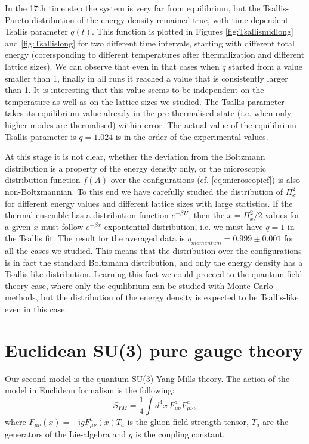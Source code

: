 \documentclass[aps,prd,twocolumn,showpacs,superscriptaddress,groupedaddress]{revtex4}  %
\begin{document}
In the 17th time step the system is very far from equilibrium, but the
Tsallis-Pareto distribution of the energy density remained true, with
time dependent Tsallis parameter $q(t)$. This function is plotted in
Figures \ref{fig:Tsallismidlong} and \ref{fig:Tsallislong} for two
different time intervals, starting with different total energy
(corersponding to different temperatures after thermalization and
different lattice sizes). We can observe that even in that cases when
$q$ started from a value smaller than 1, finally in all runs it
reached a value that is consistently larger than 1. It is interesting
that this value seems to be independent on the temperature as well as
on the lattice sizes we studied. The Tsallis-parameter takes its
equilibrium value already in the pre-thermalised state (i.e. when only
higher modes are thermalised) within error. The actual value of the
equilibrium Tsallis parameter is $q=1.024$ is in the order of the
experimental values.





At this stage it is not clear, whether the deviation from the
Boltzmann distribution is a property of the energy density only, or
the microscopic distribution function $f(A)$ over the configurations
(cf. \eqref{eq:microscopicf}) is also non-Boltzmannian. To this end we
have carefully studied the distribution of $\Pi_x^2$ for different
energy values and different lattice sizes with large statistics. If
the thermal ensemble has a distribution function $e^{-\beta H}$, then
the $x=\Pi_x^2/2$ values for a given $x$ must follow $e^{-\beta x}$
expontential distribution, i.e. we must have $q=1$ in the Tsallis fit.
The result for the averaged data is
\mbox{$q_{momentum} = 0.999 \pm 0.001$} for all the cases we
studied. This means that the distribution over the configurations is
in fact the standard Boltzmann distribution, and only the energy
density has a Tsallis-like distribution. Learning this fact we could
proceed to the quantum field theory case, where only the equilibrium
can be studied with Monte Carlo methods, but the distribution of the
energy density is expected to be Tsallis-like even in this case.

\section{Euclidean SU(3) pure gauge theory}

Our second model is the quantum SU(3) Yang-Mills theory. The action of
the model in Euclidean formalism is the following:
\begin{equation}
S_{YM}=\frac{1}{4}\int d^4x \,F^a_{\mu \nu}F^a_{\mu \nu},
\end{equation}
where $F_{\mu \nu}(x)=-\mathfrak{i}gF^a_{\mu\nu}(x)T_a$ is the gluon field strength tensor, $T_a$ are the generators of the Lie-algebra and $g$ is the coupling constant.
\end{document}

